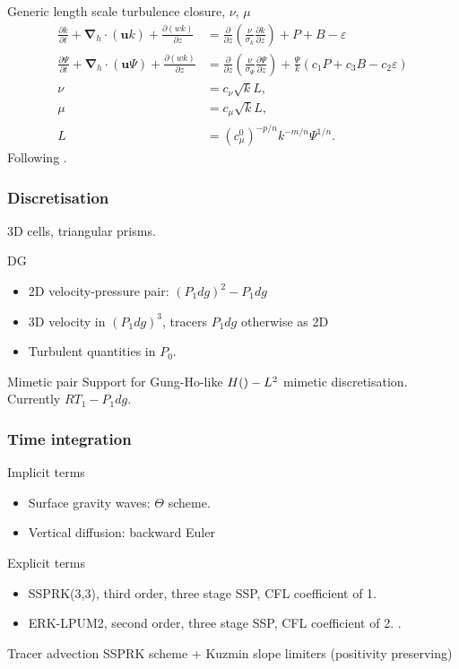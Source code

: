 \documentclass{beamer}
\renewcommand{\vec}[1]{\ensuremath{\boldsymbol{#1}}}
\newcommand{\ddt}[1]{\frac{\partial #1}{\partial t}}
\newcommand{\dd}[2]{\frac{\partial #1}{\partial #2}}
\newcommand{\nablah}{\ensuremath{\vec{\nabla}_{\!\!h}}}
\let\div\relax
\DeclareMathOperator{\div}{div}
\begin{document}
\begin{frame}[allowframebreaks]
\begin{block}{Generic length scale turbulence closure, $\nu$, $\mu$}
  \begin{align*}
    \ddt{k} + \nablah \cdot (\vec{u} k) + \dd{(w k)}{z} &= \dd{}{z}\left(\frac{\nu}{\sigma_k} \dd{k}{z}\right) + P + B - \varepsilon\\
    \dd{\Psi}{t} + \nablah \cdot (\vec{u} \Psi) + \dd{(w k)}{z} &= \dd{}{z}\left(\frac{\nu}{\sigma_\Psi} \dd{\Psi}{z}\right) + \frac{\Psi}{k}(c_1 P + c_3 B - c_2 \varepsilon) \\
    \nu &= c_\nu \sqrt{k} L, \\
    \mu &= c_{\mu} \sqrt{k} L, \\
    L &= \left(c_\mu^0\right)^{-p/n} k^{-m/n} \Psi^{1/n}.
  \end{align*}
  Following \cite{Umlauf:2003}.
\end{block}
\end{frame}

\begin{frame}
  \frametitle{Discretisation}
  3D cells, triangular prisms.
  \begin{block}{DG}
    \begin{itemize}
    \item 2D velocity-pressure pair: $(P_1dg)^2-P_1dg$
    \item 3D velocity in $(P_1dg)^3$, tracers $P_1dg$ otherwise as 2D
    \item Turbulent quantities in $P_0$.
    \end{itemize}
  \end{block}
  \begin{block}{Mimetic pair}
    Support for Gung-Ho-like $H(\div)-L^2$ mimetic discretisation.
    Currently $RT_1-P_1dg$.
  \end{block}
\end{frame}


\begin{frame}[t]
  \frametitle{Time integration}
  \begin{block}{Implicit terms}
    \begin{itemize}
    \item Surface gravity waves: $\Theta$ scheme.
    \item Vertical diffusion: backward Euler
    \end{itemize}
  \end{block}
  \begin{block}{Explicit terms}
    \begin{itemize}
    \item SSPRK(3,3), third order, three stage SSP, CFL coefficient of 1.
    \item ERK-LPUM2, second order, three stage SSP, CFL coefficient of
      2.  \cite{Higueras:2014}.
    \end{itemize}
  \end{block}
  \begin{block}{Tracer advection}
    SSPRK scheme + Kuzmin slope limiters (positivity preserving)
  \end{block}
\end{frame}
\end{document}
